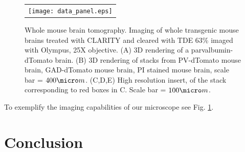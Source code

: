 \documentclass[12pt]{spieman}  %
\begin{document}
	\begin{figure}
   \begin{center}
   \begin{tabular}{c}
   \texttt{[image: data\_panel.eps]}
   \end{tabular}
   \end{center}
   \caption{\label{fig:LSMdata} Whole mouse brain tomography. Imaging of whole transgenic mouse brains treated with CLARITY and cleared with TDE 63\% imaged with Olympus, 25X objective. (A) 3D rendering of a parvalbumin-dTomato brain. (B) 3D rendering of stacks from PV-dTomato mouse brain, GAD-dTomato mouse brain,  PI stained mouse brain, scale bar = $400 \micro m$. (C,D,E) High resolution insert, of the stack corresponding to red boxes in C. Scale bar = $100 \micro m$.} 
   \end{figure}
	
	To exemplify the imaging capabilities of our microscope see Fig. \ref{fig:LSMdata}. 

\section{Conclusion}

\end{document}
